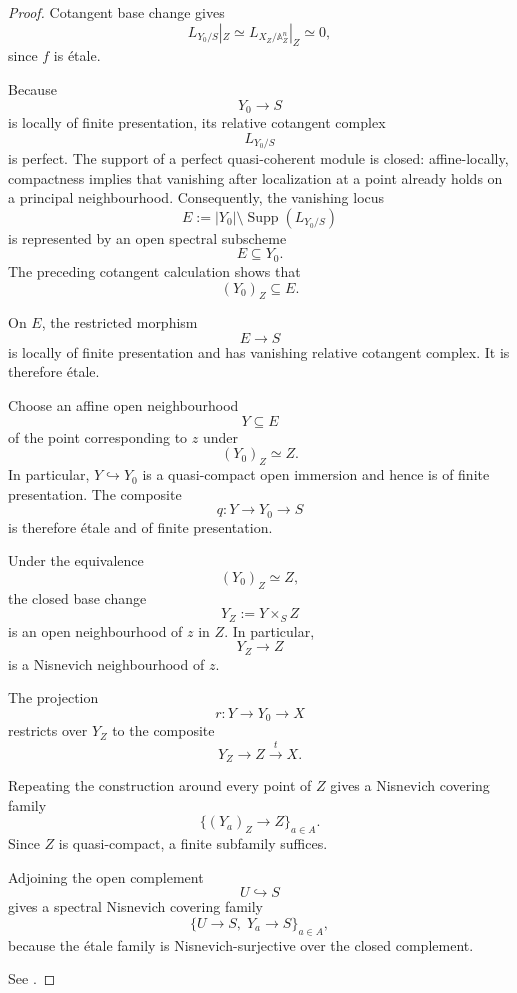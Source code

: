 \begin{proof}
Cotangent base change gives
\[
    L_{Y_0/S}|_Z
    \simeq
    L_{X_Z/\mathbb A_Z^n}|_Z
    \simeq
    0,
\]
since \(f\) is étale.

Because
\[
    Y_0
    \longrightarrow
    S
\]
is locally of finite presentation, its relative cotangent complex
\[
    L_{Y_0/S}
\]
is perfect.  The support of a perfect quasi-coherent module is closed:
affine-locally, compactness implies that vanishing after localization at
a point already holds on a principal neighbourhood.  Consequently, the
vanishing locus
\[
    E
    :=
    |Y_0|
    \setminus
    \operatorname{Supp}(L_{Y_0/S})
\]
is represented by an open spectral subscheme
\[
    E
    \subseteq
    Y_0.
\]
The preceding cotangent calculation shows that
\[
    (Y_0)_Z
    \subseteq
    E.
\]

On \(E\), the restricted morphism
\[
    E
    \longrightarrow
    S
\]
is locally of finite presentation and has vanishing relative cotangent
complex.  It is therefore étale.

Choose an affine open neighbourhood
\[
    Y
    \subseteq
    E
\]
of the point corresponding to \(z\) under
\[
    (Y_0)_Z
    \simeq
    Z.
\]
In particular, \(Y\hookrightarrow Y_0\) is a quasi-compact open
immersion and hence is of finite presentation.  The composite
\[
    q
    \colon
    Y
    \longrightarrow
    Y_0
    \longrightarrow
    S
\]
is therefore étale and of finite presentation.

Under the equivalence
\[
    (Y_0)_Z
    \simeq
    Z,
\]
the closed base change
\[
    Y_Z
    :=
    Y\times_SZ
\]
is an open neighbourhood of \(z\) in \(Z\).  In particular,
\[
    Y_Z
    \longrightarrow
    Z
\]
is a Nisnevich neighbourhood of \(z\).

The projection
\[
    r
    \colon
    Y
    \longrightarrow
    Y_0
    \longrightarrow
    X
\]
restricts over \(Y_Z\) to the composite
\[
    Y_Z
    \longrightarrow
    Z
    \xrightarrow{t}
    X.
\]

Repeating the construction around every point of \(Z\) gives a
Nisnevich covering family
\[
    \{(Y_a)_Z\to Z\}_{a\in A}.
\]
Since \(Z\) is quasi-compact, a finite subfamily suffices.

Adjoining the open complement
\[
    U
    \hookrightarrow
    S
\]
gives a spectral Nisnevich covering family
\[
    \{U\to S,\;Y_a\to S\}_{a\in A},
\]
because the étale family is Nisnevich-surjective over the closed
complement.

See
\cite{KhanBraveNewMotivicI}.
\end{proof}


